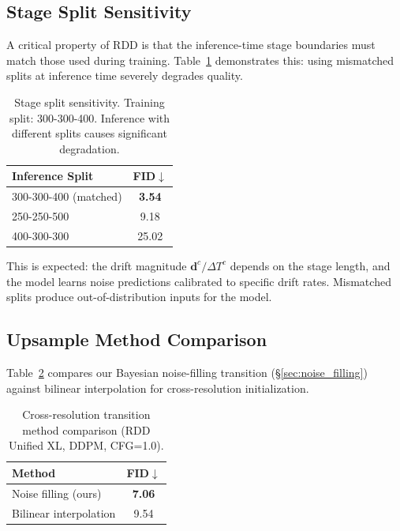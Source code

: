 \documentclass[10pt]{article}
\newcommand{\bd}{\bm{d}}
\begin{document}
\subsection{Stage Split Sensitivity}
\label{sec:stage_split}

A critical property of RDD is that the inference-time stage boundaries must match those used during training.
Table~\ref{tab:stage_split} demonstrates this: using mismatched splits at inference time severely degrades quality.

\begin{table}[t]
\centering
\caption{Stage split sensitivity. Training split: 300-300-400. Inference with different splits causes significant degradation.}
\label{tab:stage_split}
\begin{tabular}{@{}lc@{}}
\toprule
\textbf{Inference Split} & \textbf{FID}$\downarrow$ \\
\midrule
300-300-400 (matched) & \textbf{3.54} \\
250-250-500 & 9.18 \\
400-300-300 & 25.02 \\
\bottomrule
\end{tabular}
\end{table}

This is expected: the drift magnitude $\bd^c / \Delta T^c$ depends on the stage length, and the model learns noise predictions calibrated to specific drift rates.
Mismatched splits produce out-of-distribution inputs for the model.

\subsection{Upsample Method Comparison}
\label{sec:upsample}

Table~\ref{tab:upsample} compares our Bayesian noise-filling transition (\S\ref{sec:noise_filling}) against bilinear interpolation for cross-resolution initialization.

\begin{table}[t]
\centering
\caption{Cross-resolution transition method comparison (RDD Unified XL, DDPM, CFG=1.0).}
\label{tab:upsample}
\begin{tabular}{@{}lc@{}}
\toprule
\textbf{Method} & \textbf{FID}$\downarrow$ \\
\midrule
Noise filling (ours) & \textbf{7.06} \\
Bilinear interpolation & 9.54 \\
\bottomrule
\end{tabular}
\end{table}
\end{document}
